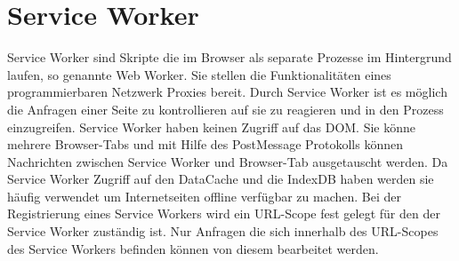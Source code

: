 \section{Service Worker}
Service Worker sind Skripte die im Browser als separate Prozesse im Hintergrund laufen, so genannte Web Worker. Sie stellen die Funktionalitäten eines programmierbaren Netzwerk Proxies bereit. Durch Service Worker ist es möglich die Anfragen einer Seite zu kontrollieren auf sie zu reagieren und in den Prozess einzugreifen.\cite{w3ServiceWorker} Service Worker haben keinen Zugriff auf das DOM. Sie könne mehrere Browser-Tabs und mit Hilfe des PostMessage Protokolls können Nachrichten zwischen Service Worker und Browser-Tab ausgetauscht werden. Da Service Worker Zugriff auf den DataCache und die IndexDB haben werden sie häufig verwendet um Internetseiten offline verfügbar zu machen. Bei der Registrierung eines Service Workers wird ein URL-Scope fest gelegt für den der Service Worker zuständig ist. Nur Anfragen die sich innerhalb des URL-Scopes des Service Workers befinden können von diesem bearbeitet werden.

